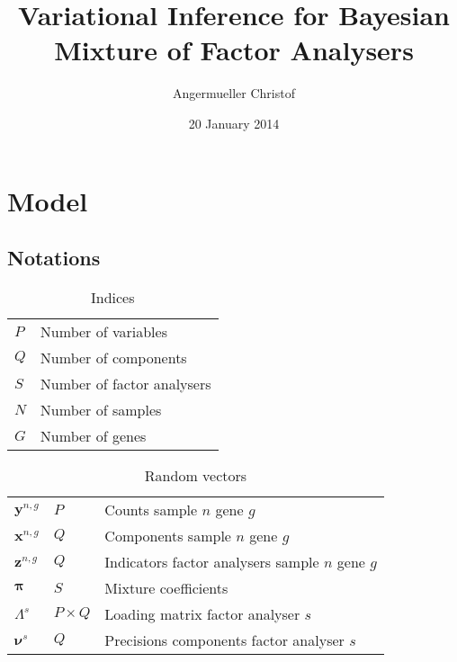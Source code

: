 \documentclass[a4paper]{article}
\author{Angermueller Christof}
\date{20 January 2014}
\title{Variational Inference for Bayesian Mixture of Factor Analysers}
\begin{document}
\maketitle

\newcommand{\bs}{\boldsymbol}
\newcommand{\Xy}{\bs{y}^{n,g}}
\newcommand{\Xx}{\bs{x}^{n,g}}
\newcommand{\Xz}{\bs{z}^{n,g}}
\newcommand{\Xp}{\bs{\pi}}
\newcommand{\Xl}{\Lambda^s}
\newcommand{\Xn}{\bs{\nu}^s}
\newcommand{\Xe}{\Psi}
\newcommand{\Xa}{\alpha}
\newcommand{\Xc}{\Xl{\Xl}^T}

\section{Model}
\subsection{Notations}
\begin{table}[h]
  \begin{center}
  \begin{tabular}{ll}
    $P$ & Number of variables \\
    $Q$ & Number of components \\
    $S$ & Number of factor analysers \\
    $N$ & Number of samples \\
    $G$ & Number of genes \\
  \end{tabular}
  \caption{Indices}
\end{center}
\end{table}

\begin{table}[h]
  \begin{center}
  \begin{tabular}{lll}
    $\Xy$ & $P$ & Counts sample $n$ gene $g$ \\
    $\Xx$ & $Q$ & Components sample $n$ gene $g$ \\
    $\Xz$ & $Q$ & Indicators factor analysers sample $n$ gene $g$ \\
    $\Xp$ & $S$ & Mixture coefficients \\
    $\Xl$ & $P \times Q$ & Loading matrix factor analyser $s$ \\
    $\Xn$ & $Q$ & Precisions components factor analyser $s$ \\
  \end{tabular}
  \caption{Random vectors}
\end{center}
\end{table}
\end{document}
